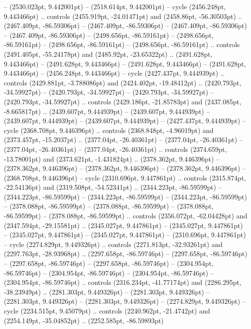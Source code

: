  -- (2530.023pt, 9.442001pt)
 -- (2518.614pt, 9.442001pt) -- cycle
(2456.248pt, 9.443466pt) .. controls (2455.919pt, -24.01471pt) and (2458.86pt, -56.30503pt) .. (2467.409pt, -86.59306pt)
 -- (2467.409pt, -86.59306pt)
 -- (2467.409pt, -86.59306pt)
 -- (2467.409pt, -86.59306pt)
 -- (2498.656pt, -86.59161pt)
 -- (2498.656pt, -86.59161pt)
 -- (2498.656pt, -86.59161pt)
 -- (2498.656pt, -86.59161pt) .. controls (2491.405pt, -55.24178pt) and (2485.92pt, -23.65322pt) .. (2491.628pt, 9.443466pt)
 -- (2491.628pt, 9.443466pt)
 -- (2491.628pt, 9.443466pt)
 -- (2491.628pt, 9.443466pt)
 -- (2456.248pt, 9.443466pt) -- cycle
(2427.437pt, 9.444939pt) .. controls (2429.881pt, -3.788086pt) and (2424.402pt, -19.48412pt) .. (2420.793pt, -34.59927pt)
 -- (2420.793pt, -34.59927pt)
 -- (2420.793pt, -34.59927pt)
 -- (2420.793pt, -34.59927pt) .. controls (2429.186pt, -21.85783pt) and (2437.085pt, -8.665817pt) .. (2439.607pt, 9.444939pt)
 -- (2439.607pt, 9.444939pt)
 -- (2439.607pt, 9.444939pt)
 -- (2439.607pt, 9.444939pt)
 -- (2427.437pt, 9.444939pt) -- cycle
(2368.708pt, 9.446396pt) .. controls (2368.848pt, -4.96019pt) and (2373.457pt, -15.2037pt) .. (2377.04pt, -26.40361pt)
 -- (2377.04pt, -26.40361pt)
 -- (2377.04pt, -26.40361pt)
 -- (2377.04pt, -26.40361pt) .. controls (2374.659pt, -13.78001pt) and (2373.621pt, -1.431824pt) .. (2378.362pt, 9.446396pt)
 -- (2378.362pt, 9.446396pt)
 -- (2378.362pt, 9.446396pt)
 -- (2378.362pt, 9.446396pt)
 -- (2368.708pt, 9.446396pt) -- cycle
(2310.696pt, 9.447861pt) .. controls (2315.874pt, -22.54136pt) and (2319.508pt, -54.52341pt) .. (2344.223pt, -86.59599pt)
 -- (2344.223pt, -86.59599pt)
 -- (2344.223pt, -86.59599pt)
 -- (2344.223pt, -86.59599pt)
 -- (2378.088pt, -86.59599pt)
 -- (2378.088pt, -86.59599pt)
 -- (2378.088pt, -86.59599pt)
 -- (2378.088pt, -86.59599pt) .. controls (2356.072pt, -62.04428pt) and (2347.594pt, -29.15581pt) .. (2345.027pt, 9.447861pt)
 -- (2345.027pt, 9.447861pt)
 -- (2345.027pt, 9.447861pt)
 -- (2345.027pt, 9.447861pt)
 -- (2310.696pt, 9.447861pt) -- cycle
(2274.829pt, 9.449326pt) .. controls (2271.813pt, -32.93261pt) and (2297.763pt, -28.93968pt) .. (2297.658pt, -86.59746pt)
 -- (2297.658pt, -86.59746pt)
 -- (2297.658pt, -86.59746pt)
 -- (2297.658pt, -86.59746pt)
 -- (2304.954pt, -86.59746pt)
 -- (2304.954pt, -86.59746pt)
 -- (2304.954pt, -86.59746pt)
 -- (2304.954pt, -86.59746pt) .. controls (2316.234pt, -41.77174pt) and (2286.295pt, -38.23949pt) .. (2281.303pt, 9.449326pt)
 -- (2281.303pt, 9.449326pt)
 -- (2281.303pt, 9.449326pt)
 -- (2281.303pt, 9.449326pt)
 -- (2274.829pt, 9.449326pt) -- cycle
(2234.515pt, 9.45079pt) .. controls (2240.962pt, -21.4742pt) and (2254.149pt, -35.04852pt) .. (2252.585pt, -86.59893pt)
